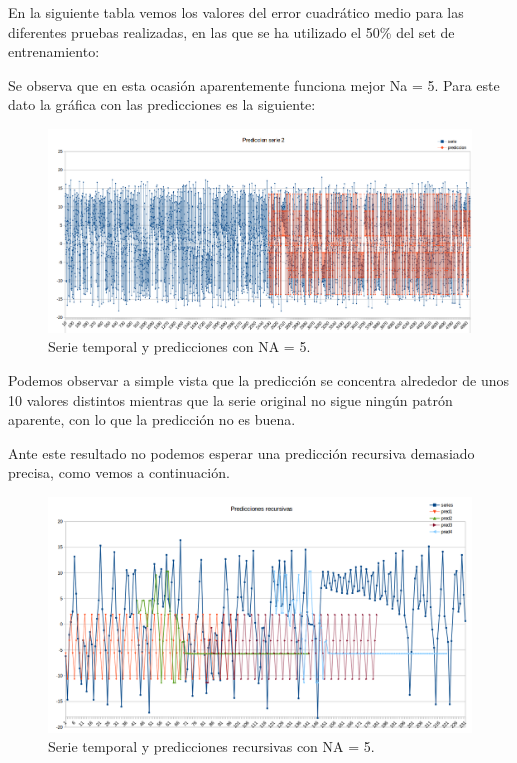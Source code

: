 \documentclass[spanish]{assignment}
\begin{document}
	En la siguiente tabla vemos los valores del error cuadrático medio para las diferentes pruebas realizadas, en las que se ha utilizado el 50\% del set de entrenamiento:
	
	\vspace{5mm}
	\noindent{}
	\vspace{5mm}
	
	Se observa que en esta ocasión aparentemente funciona mejor Na = 5. Para este dato la gráfica con las predicciones es la siguiente:
	
	\begin{figure}[H]
		\centering
		\includegraphics[scale=0.25]{p3_serie2_NA5.png}		
		\caption{Serie temporal y predicciones con NA = 5.}				
		\label{grafico_serie2_predNA5}
	\end{figure}
	
	Podemos observar a simple vista que la predicción se concentra alrededor de unos 10 valores distintos mientras que la serie original no sigue ningún patrón aparente, con lo que la predicción no es buena.
	
	Ante este resultado no podemos esperar una predicción recursiva demasiado precisa, como vemos a continuación.
	
	\begin{figure}[H]
		\centering
		\includegraphics[scale=0.25]{p3_serie2_rec.png}		
		\caption{Serie temporal y predicciones recursivas con NA = 5.}				
		\label{grafico_serie2_predNA5_rec}
	\end{figure}
	
	
	
\end{document}
